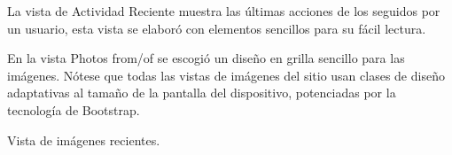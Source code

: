 \documentclass{memoria}
\begin{document}
La vista de Actividad Reciente muestra las últimas acciones de los seguidos por un usuario, esta vista se elaboró con elementos sencillos para su fácil lectura.

\newpage

En la vista Photos from/of se escogió un diseño en grilla sencillo para las imágenes. Nótese que todas las vistas de imágenes del sitio usan clases de diseño adaptativas al tamaño de la pantalla del dispositivo, potenciadas por la tecnología de Bootstrap.

Vista de imágenes recientes.
\end{document}
